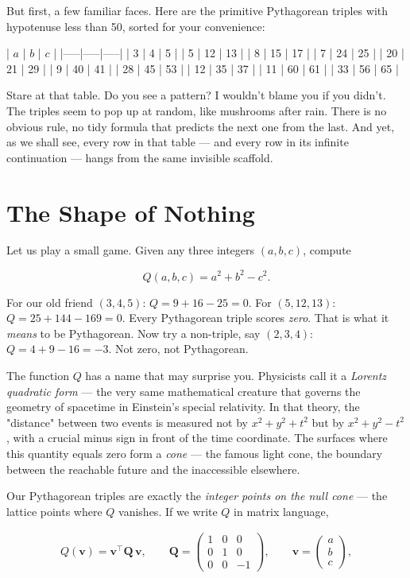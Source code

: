 \documentclass[11pt,twoside,openright]{book}
\theoremstyle{definition}
\theoremstyle{remark}
\begin{document}
But first, a few familiar faces. Here are the primitive Pythagorean triples with hypotenuse less than 50, sorted for your convenience:

| $a$ | $b$ | $c$ |
|-----|-----|-----|
| 3   | 4   | 5   |
| 5   | 12  | 13  |
| 8   | 15  | 17  |
| 7   | 24  | 25  |
| 20  | 21  | 29  |
| 9   | 40  | 41  |
| 28  | 45  | 53  |
| 12  | 35  | 37  |
| 11  | 60  | 61  |
| 33  | 56  | 65  |

Stare at that table. Do you see a pattern? I wouldn't blame you if you didn't. The triples seem to pop up at random, like mushrooms after rain. There is no obvious rule, no tidy formula that predicts the next one from the last. And yet, as we shall see, every row in that table --- and every row in its infinite continuation --- hangs from the same invisible scaffold.


\section{The Shape of Nothing}

Let us play a small game. Given any three integers $(a, b, c)$, compute

\[Q(a, b, c) = a^2 + b^2 - c^2.\]

For our old friend $(3, 4, 5)$: $Q = 9 + 16 - 25 = 0$. For $(5, 12, 13)$: $Q = 25 + 144 - 169 = 0$. Every Pythagorean triple scores \textit{zero}. That is what it \textit{means} to be Pythagorean. Now try a non-triple, say $(2, 3, 4)$: $Q = 4 + 9 - 16 = -3$. Not zero, not Pythagorean.

The function $Q$ has a name that may surprise you. Physicists call it a \textit{Lorentz quadratic form} --- the very same mathematical creature that governs the geometry of spacetime in Einstein's special relativity. In that theory, the "distance" between two events is measured not by $x^2 + y^2 + t^2$ but by $x^2 + y^2 - t^2$, with a crucial minus sign in front of the time coordinate. The surfaces where this quantity equals zero form a \textit{cone} --- the famous light cone, the boundary between the reachable future and the inaccessible elsewhere.


Our Pythagorean triples are exactly the \textit{integer points on the null cone} --- the lattice points where $Q$ vanishes. If we write $Q$ in matrix language,

\begin{align*}
Q(\mathbf{v}) = \mathbf{v}^\top \mathbf{Q}\, \mathbf{v}, \qquad \mathbf{Q} = \begin{pmatrix} 1 & 0 & 0 \\ 0 & 1 & 0 \\ 0 & 0 & -1 \end{pmatrix}, \qquad \mathbf{v} = \begin{pmatrix} a \\ b \\ c \end{pmatrix},
\end{align*}
\end{document}
